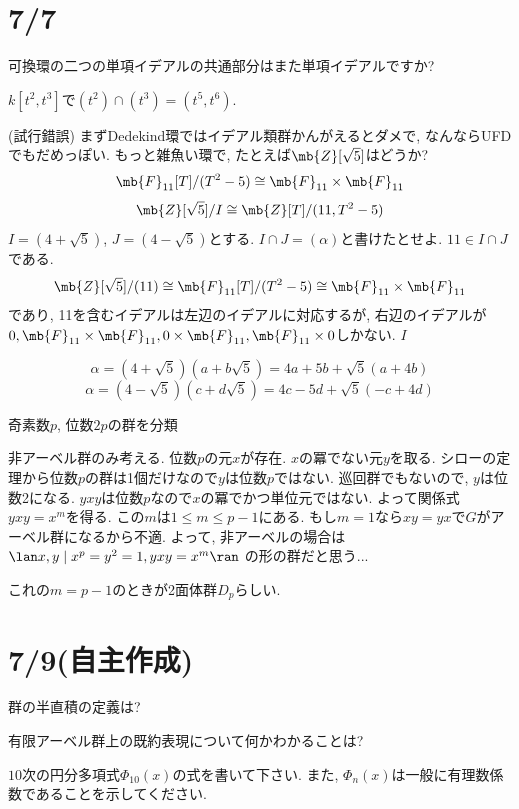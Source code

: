 \clearpage 
\section{7/7}
\begin{prob}
可換環の二つの単項イデアルの共通部分はまた単項イデアルですか? 
\end{prob}
\begin{ans}
$k[t^2,t^3]$で$(t^2) \cap (t^3) = (t^5,t^6)$. 
\end{ans}

\begin{miss} (試行錯誤) まずDedekind環ではイデアル類群かんがえるとダメで, なんならUFDでもだめっぽい. もっと雑魚い環で, たとえば$\mb{Z}[\sqrt{5}]$はどうか? 
\[\mb{F}_{11}[T]/(T^2-5) \cong \mb{F}_{11}\times \mb{F}_{11}\]
\[\mb{Z}[\sqrt{5}]/I \cong \mb{Z}[T]/(11,T^2-5)\]
$I=(4 + \sqrt{5})$, $J=(4-\sqrt{5})$とする. $I\cap J = (\alpha)$と書けたとせよ.  $11\in I\cap J$である. 
\[\mb{Z}[\sqrt{5}]/(11) \cong \mb{F}_{11}[T]/(T^2-5) \cong \mb{F}_{11}\times \mb{F}_{11}\]
であり, 11を含むイデアルは左辺のイデアルに対応するが, 右辺のイデアルが$0, \mb{F}_{11}\times \mb{F}_{11}, 0\times \mb{F}_{11}, \mb{F}_{11}\times 0$しかない. $I$



\[\alpha = (4+\sqrt{5})(a+b\sqrt{5}) = 4a + 5b + \sqrt{5}(a + 4b)\]
\[\alpha = (4-\sqrt{5})(c+d\sqrt{5}) = 4c - 5d + \sqrt{5}(-c + 4d)\]

\end{miss}


\begin{prob}
奇素数$p$, 位数$2p$の群を分類
\end{prob}
\begin{ans}
非アーベル群のみ考える. 位数$p$の元$x$が存在. $x$の冪でない元$y$を取る. シローの定理から位数$p$の群は1個だけなので$y$は位数$p$ではない. 巡回群でもないので, $y$は位数2になる. $yxy$は位数$p$なので$x$の冪でかつ単位元ではない. よって関係式$yxy = x^m$を得る. この$m$は$1\leq m\leq p-1$にある. もし$m=1$なら$xy=yx$で$G$がアーベル群になるから不適. よって, 非アーベルの場合は$\lan x,y \mid x^p = y^2 = 1,  yxy = x^m \ran$ の形の群だと思う...
\end{ans}
\begin{rem}
これの$m=p-1$のときが2面体群$D_{p}$らしい. 
\end{rem}
\clearpage 
\section{7/9(自主作成)}
\begin{prob}
群の半直積の定義は? 
\end{prob}
\begin{prob}
有限アーベル群上の既約表現について何かわかることは?
\end{prob}
\begin{prob}
$10$次の円分多項式$\Phi_{10}(x)$の式を書いて下さい. また, $\Phi_n(x)$は一般に有理数係数であることを示してください. 
\end{prob}

